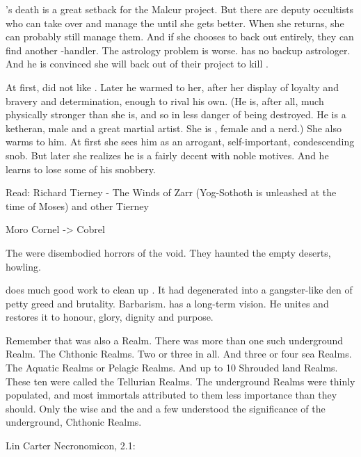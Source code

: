 \Urizeth's death is a great setback for the Malcur project.
But there are deputy occultists who can take over and manage the \noggyaleth until she gets better.
When she returns, she can probably still manage them.
And if she chooses to back out entirely, they can find another \noggyal-handler.
The astrology problem is worse.
\Teshrial has no backup astrologer.
And he is convinced she will back out of their project to kill \Ishnaruchaefir.

At first, \Teshrial did not like \Urizeth.
Later he warmed to her, after her display of loyalty and bravery and determination, enough to rival his own. 
(He is, after all, much physically stronger than she is, and so in less danger of being destroyed. He is a ketheran, male and a great martial artist. She is \thelyad, female and a nerd.)
She also warms to him.
At first she sees him as an arrogant, self-important, condescending snob.
But later she realizes he is a fairly decent \resphan with noble motives.
And he learns to lose some of his snobbery.

Read: Richard Tierney - The Winds of Zarr (Yog-Sothoth is unleashed at the time of Moses)
and other Tierney

Moro Cornel -> Cobrel

The \jinn were disembodied horrors of the void.
They haunted the empty deserts, howling. 

\Dasteron does much good work to clean up \Mystraacht.
It had degenerated into a gangster-like den of petty greed and brutality. 
Barbarism.
\Dasteron has a long-term vision.
He unites \Mystraacht and restores it to honour, glory, dignity and purpose.

Remember that \KaiLeng was also a Realm.
There was more than one such underground Realm. The Chthonic Realms.
Two or three in all.
And three or four sea Realms. The Aquatic Realms or Pelagic Realms.
And up to 10 Shrouded land Realms. These ten were called the Tellurian Realms.
The underground Realms were thinly populated, and most immortals attributed to them less importance than they should.
Only the wise \dragons and the \banelords and a few \resphain understood the significance of the underground, Chthonic Realms.

Lin Carter Necronomicon, 2.1:

